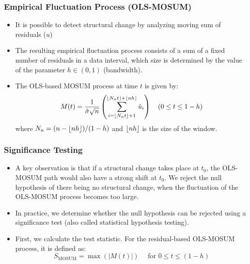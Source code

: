 \documentclass[presentation.tex]{subfiles}
\begin{document}
\begin{frame}
  \frametitle{Empirical Fluctuation Process (OLS-MOSUM)}
  \begin{itemize}
  \item It is possible to detect structural change by analyzing moving sum of residuals ($\hat{u}$)
  \item 
    The resulting empirical fluctuation process consists of a
    sum of a fixed number of residuals in a data interval, which size is determined
    by the value of the parameter $h \in (0,1)$ (bandwidth).
  \item 
  The OLS-based MOSUM process at time $t$ is given by:
  \begin{equation}\label{eq:mosum_og}
    M(t)=\frac{1}{\hat{\sigma} \sqrt{n}}
    \left(\sum_{i=\lfloor N_{n} t\rfloor+1}^{\left\lfloor N_{n} t\right\rfloor+\lfloor
      n h\rfloor} \hat{u}_{i}\right) \quad(0 \leq t \leq 1-h)
  \end{equation}
  where $N_{n}=(n-\lfloor n h\rfloor) /(1-h)$ and $\lfloor n h\rfloor$ is the size of the
  window. 
  \end{itemize}
\end{frame}

\begin{frame}
  \frametitle{Significance Testing}
  \begin{itemize}
  \item 
    A key observation is that if a structural change takes place at $t_0$, the
    OLS-MOSUM path would also have a strong shift at $t_0$.
    We reject the null hypothesis of there being no structural change, when the fluctuation of
    the OLS-MOSUM process becomes too large.
  \item
    In practice, we determine whether the null
    hypothesis can be rejected using a significance test (also called statistical
    hypothesis testing).
  \item 
    First, we calculate the test statistic. For the residual-based OLS-MOSUM
    process, it is defined as:
    \begin{equation} \label{eq:test_statistic_og}
      S_{\text{MOSUM}} = \max(|M(t)|) \quad \text{ for } 0 \leq t \leq (1-h)
    \end{equation}
  \end{itemize}
\end{frame}
\end{document}
